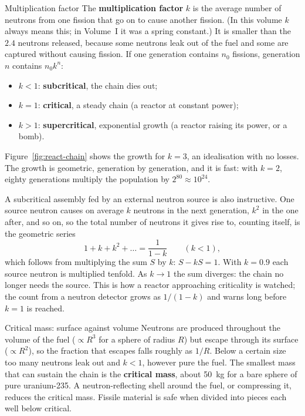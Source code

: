 \begin{defbox}{Multiplication factor}
The \textbf{multiplication factor} $k$ is the average number of neutrons from one fission that go on to
cause another fission. (In this volume $k$ always means this; in Volume~I it was a spring constant.) It is
smaller than the $2.4$ neutrons released, because some neutrons leak out of the fuel and some are captured
without causing fission. If one generation contains $n_0$ fissions, generation $n$ contains $n_0k^n$:
\begin{itemize}[itemsep=1pt]
\item $k<1$: \textbf{subcritical}, the chain dies out;
\item $k=1$: \textbf{critical}, a steady chain (a reactor at constant power);
\item $k>1$: \textbf{supercritical}, exponential growth (a reactor raising its power, or a bomb).
\end{itemize}
\end{defbox}

Figure~\ref{fig:react-chain} shows the growth for $k=3$, an idealisation with no losses. The growth is
geometric, generation by generation, and it is fast: with $k=2$, eighty generations multiply the
population by $2^{80}\approx10^{24}$.

\begin{figure}[htbp]\centering
{}
\end{figure}

A subcritical assembly fed by an external neutron source is also instructive. One source neutron
causes on average $k$ neutrons in the next generation, $k^2$ in the one after, and so on, so the total
number of neutrons it gives rise to, counting itself, is the geometric series
\[
1+k+k^2+\dots=\frac{1}{1-k}\qquad(k<1),
\]
which follows from multiplying the sum $S$ by $k$: $S-kS=1$. With $k=0.9$ each source neutron is
multiplied tenfold. As $k\to1$ the sum diverges: the chain no longer needs the source. This is how a
reactor approaching criticality is watched; the count from a neutron detector grows as $1/(1-k)$ and
warns long before $k=1$ is reached.

\begin{keybox}{Critical mass: surface against volume}
Neutrons are produced throughout the volume of the fuel ($\propto R^3$ for a sphere of radius $R$) but
escape through its surface ($\propto R^2$), so the fraction that escapes falls roughly as $1/R$. Below a
certain size too many neutrons leak out and $k<1$, however pure the fuel. The smallest mass that can
sustain the chain is the \textbf{critical mass}, about \SI{50}{kg} for a bare sphere of pure
uranium-235. A neutron-reflecting shell around the fuel, or compressing it, reduces the critical mass.
Fissile material is safe when divided into pieces each well below critical.
\end{keybox}

